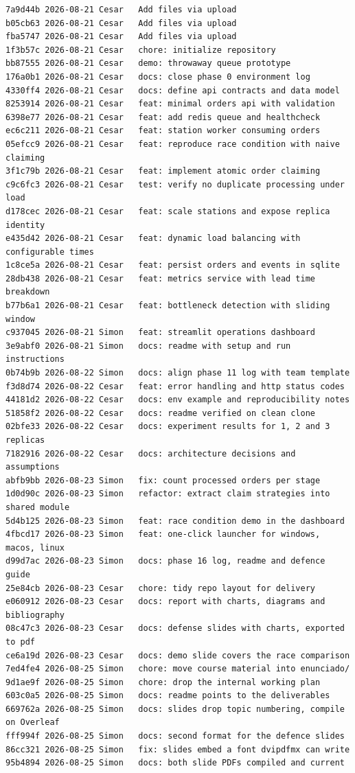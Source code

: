 \documentclass[12pt,a4paper]{article}
\begin{document}
\begin{lstlisting}
7a9d44b 2026-08-21 Cesar   Add files via upload
b05cb63 2026-08-21 Cesar   Add files via upload
fba5747 2026-08-21 Cesar   Add files via upload
1f3b57c 2026-08-21 Cesar   chore: initialize repository
bb87555 2026-08-21 Cesar   demo: throwaway queue prototype
176a0b1 2026-08-21 Cesar   docs: close phase 0 environment log
4330ff4 2026-08-21 Cesar   docs: define api contracts and data model
8253914 2026-08-21 Cesar   feat: minimal orders api with validation
6398e77 2026-08-21 Cesar   feat: add redis queue and healthcheck
ec6c211 2026-08-21 Cesar   feat: station worker consuming orders
05efcc9 2026-08-21 Cesar   feat: reproduce race condition with naive claiming
3f1c79b 2026-08-21 Cesar   feat: implement atomic order claiming
c9c6fc3 2026-08-21 Cesar   test: verify no duplicate processing under load
d178cec 2026-08-21 Cesar   feat: scale stations and expose replica identity
e435d42 2026-08-21 Cesar   feat: dynamic load balancing with configurable times
1c8ce5a 2026-08-21 Cesar   feat: persist orders and events in sqlite
28db438 2026-08-21 Cesar   feat: metrics service with lead time breakdown
b77b6a1 2026-08-21 Cesar   feat: bottleneck detection with sliding window
c937045 2026-08-21 Simon   feat: streamlit operations dashboard
3e9abf0 2026-08-21 Simon   docs: readme with setup and run instructions
0b74b9b 2026-08-22 Simon   docs: align phase 11 log with team template
f3d8d74 2026-08-22 Cesar   feat: error handling and http status codes
44181d2 2026-08-22 Cesar   docs: env example and reproducibility notes
51858f2 2026-08-22 Cesar   docs: readme verified on clean clone
02bfe33 2026-08-22 Cesar   docs: experiment results for 1, 2 and 3 replicas
7182916 2026-08-22 Cesar   docs: architecture decisions and assumptions
abfb9bb 2026-08-23 Simon   fix: count processed orders per stage
1d0d90c 2026-08-23 Simon   refactor: extract claim strategies into shared module
5d4b125 2026-08-23 Simon   feat: race condition demo in the dashboard
4fbcd17 2026-08-23 Simon   feat: one-click launcher for windows, macos, linux
d99d7ac 2026-08-23 Simon   docs: phase 16 log, readme and defence guide
25e84cb 2026-08-23 Cesar   chore: tidy repo layout for delivery
e060912 2026-08-23 Cesar   docs: report with charts, diagrams and bibliography
08c47c3 2026-08-23 Cesar   docs: defense slides with charts, exported to pdf
ce6a19d 2026-08-23 Cesar   docs: demo slide covers the race comparison
7ed4fe4 2026-08-25 Simon   chore: move course material into enunciado/
9d1ae9f 2026-08-25 Simon   chore: drop the internal working plan
603c0a5 2026-08-25 Simon   docs: readme points to the deliverables
669762a 2026-08-25 Simon   docs: slides drop topic numbering, compile on Overleaf
fff994f 2026-08-25 Simon   docs: second format for the defence slides
86cc321 2026-08-25 Simon   fix: slides embed a font dvipdfmx can write
95b4894 2026-08-25 Simon   docs: both slide PDFs compiled and current
\end{lstlisting}
\end{document}

